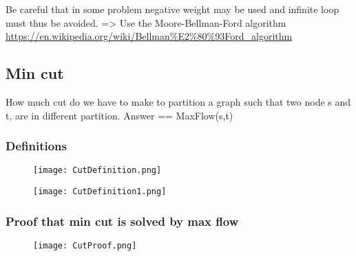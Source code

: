 Be careful that in some problem negative weight may be used and infinite loop must thus be avoided. => Use the Moore-Bellman-Ford algorithm \url{https://en.wikipedia.org/wiki/Bellman%E2%80%93Ford_algorithm} 

\subsection{Min cut}

How much cut do we have to make to partition a graph such that two node s and t, are in different partition. Answer == MaxFlow(s,t)

\subsubsection{Definitions}

\begin{figure}[!ht]
    \centering
    \texttt{[image: CutDefinition.png]}
\end{figure}
\FloatBarrier

\begin{figure}[!ht]
    \centering
    \texttt{[image: CutDefinition1.png]}
\end{figure}
\FloatBarrier

\subsubsection{Proof that min cut is solved by max flow}

\begin{figure}[!ht]
    \centering
    \texttt{[image: CutProof.png]}
\end{figure}
\FloatBarrier
